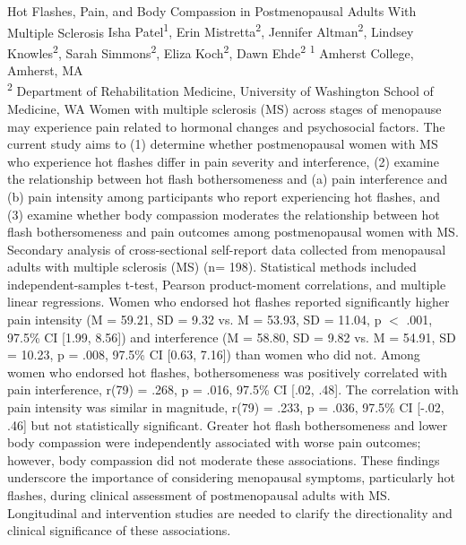 \makeabstract
    {
    Hot Flashes, Pain, and Body Compassion in Postmenopausal Adults With Multiple Sclerosis
    }
    {
    Isha Patel\textsuperscript{1}, Erin Mistretta\textsuperscript{2}, Jennifer Altman\textsuperscript{2}, Lindsey Knowles\textsuperscript{2}, Sarah Simmons\textsuperscript{2}, Eliza Koch\textsuperscript{2}, Dawn Ehde\textsuperscript{2}
    }
    {
    \textsuperscript{1} Amherst College, Amherst, MA\\
\textsuperscript{2} Department of Rehabilitation Medicine, University of Washington School of Medicine, WA
    }
    {
    Women with multiple sclerosis (MS) across stages of menopause may experience pain related to hormonal changes and psychosocial factors. The current study aims to (1) determine whether postmenopausal women with MS who experience hot flashes differ in pain severity and interference, (2) examine the relationship between hot flash bothersomeness and (a) pain interference and (b) pain intensity among participants who report experiencing hot flashes, and (3) examine whether body compassion moderates the relationship between hot flash bothersomeness and pain outcomes among postmenopausal women with MS.
    }
    {
    Secondary analysis of cross-sectional self-report data collected from menopausal adults with multiple sclerosis (MS) (n= 198). Statistical methods included independent-samples t-test, Pearson product-moment correlations, and multiple linear regressions.
    }
    {
    Women who endorsed hot flashes reported significantly higher pain intensity (M = 59.21, SD = 9.32 vs. M = 53.93, SD = 11.04, p \ensuremath{<} .001, 97.5\% CI [1.99, 8.56]) and interference (M = 58.80, SD = 9.82 vs. M = 54.91, SD = 10.23, p = .008, 97.5\% CI [0.63, 7.16]) than women who did not. Among women who endorsed hot flashes, bothersomeness was positively correlated with pain interference, r(79) = .268, p = .016, 97.5\% CI [.02, .48]. The correlation with pain intensity was similar in magnitude, r(79) = .233, p = .036, 97.5\% CI [-.02, .46] but not statistically significant. Greater hot flash bothersomeness and lower body compassion were independently associated with worse pain outcomes; however, body compassion did not moderate these associations. 
    }
    {
    These findings underscore the importance of considering menopausal symptoms, particularly hot flashes, during clinical assessment of postmenopausal adults with MS. Longitudinal and intervention studies are needed to clarify the directionality and clinical significance of these associations.
    }

    \newpage
    